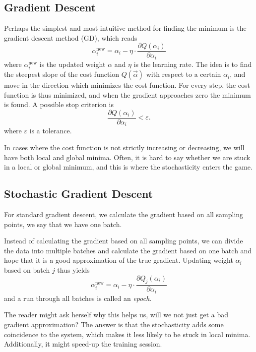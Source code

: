 \subsection{Gradient Descent} \label{sec:gd}
Perhaps the simplest and most intuitive method for finding the minimum is the gradient descent method (GD), which reads
\begin{equation}
\label{eq:GD}
\alpha_i^{\text{new}}=\alpha_i - \eta\cdot\frac{\partial Q(\alpha_i)}{\partial\alpha_i}
\end{equation}
where $\alpha_i^{\text{new}}$ is the updated weight $\alpha$ and $\eta$ is the learning rate. The idea is to find the steepest slope of the cost function $Q(\vec{\alpha})$ with respect to a certain $\alpha_i$, and move in the direction which minimizes the cost function. For every step, the cost function is thus minimized, and when the gradient approaches zero the minimum is found. A possible stop criterion is
\begin{equation}
\frac{\partial Q(\alpha_i)}{\partial\alpha_i}<\varepsilon.
\end{equation}
where $\varepsilon$ is a tolerance. 

In cases where the cost function is not strictly increasing or decreasing, we will have both local and global minima. Often, it is hard to say whether we are stuck in a local or global minimum, and this is where the stochasticity enters the game.

\subsection{Stochastic Gradient Descent}
For standard gradient descent, we calculate the gradient based on all sampling points, we say that we have one batch. 

Instead of calculating the gradient based on all sampling points, we can divide the data into multiple batches and calculate the gradient based on one batch and hope that it is a good approximation of the true gradient. Updating weight $\alpha_i$ based on batch $j$ thus yields
\begin{equation}
\label{eq:SGD}
\alpha_i^{\text{new}}=\alpha_i - \eta\cdot\frac{\partial Q_j(\alpha_i)}{\partial\alpha_i}
\end{equation}
and a run through all batches is called an \textit{epoch}. 

The reader might ask herself why this helps us, will we not just get a bad gradient approximation? The answer is that the stochasticity adds some coincidence to the system, which makes it less likely to be stuck in local minima. Additionally, it might speed-up the training session. 

